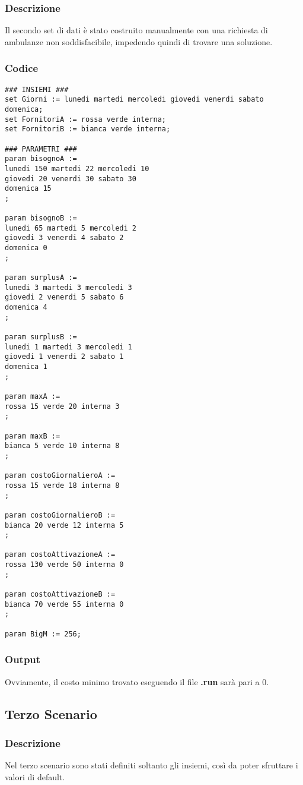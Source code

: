 \subsubsection{Descrizione}
Il secondo set di dati è stato costruito manualmente con una richiesta di ambulanze non soddisfacibile, impedendo quindi di trovare una soluzione.
\subsubsection{Codice}
\begin{lstlisting}
### INSIEMI ###
set Giorni := lunedi martedi mercoledi giovedi venerdi sabato domenica;
set FornitoriA := rossa verde interna;
set FornitoriB := bianca verde interna;

### PARAMETRI ###
param bisognoA := 
lunedi 150 martedi 22 mercoledi 10 
giovedi 20 venerdi 30 sabato 30
domenica 15
;

param bisognoB := 
lunedi 65 martedi 5 mercoledi 2
giovedi 3 venerdi 4 sabato 2
domenica 0
;

param surplusA :=
lunedi 3 martedi 3 mercoledi 3
giovedi 2 venerdi 5 sabato 6
domenica 4
;

param surplusB :=
lunedi 1 martedi 3 mercoledi 1
giovedi 1 venerdi 2 sabato 1
domenica 1
;

param maxA :=
rossa 15 verde 20 interna 3
;

param maxB :=
bianca 5 verde 10 interna 8
;

param costoGiornalieroA :=
rossa 15 verde 18 interna 8
;

param costoGiornalieroB :=
bianca 20 verde 12 interna 5
;

param costoAttivazioneA :=
rossa 130 verde 50 interna 0
;

param costoAttivazioneB :=
bianca 70 verde 55 interna 0
; 

param BigM := 256;
\end{lstlisting}
\subsubsection{Output}
Ovviamente, il costo minimo trovato eseguendo il file \textbf{.run} sarà pari a \texteuro$0$.

\subsection{Terzo Scenario}
\subsubsection{Descrizione}
Nel terzo scenario sono stati definiti soltanto gli insiemi, così da poter sfruttare i valori di default.

